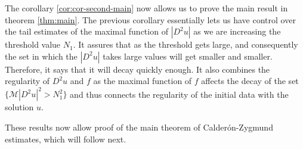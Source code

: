\documentclass[12pt]{artikel1}
\begin{document}
The corollary \ref{cor:cor-second-main} now allows us to prove the main result in theorem \ref{thm:main}. The previous corollary essentially lets us have control over the tail estimates of the maximal function of $|D^2u|$ as we are increasing the threshold value $N_1$. It assures that as the threshold gets large, and consequently the set in which the $|D^2u|$ takes large values will get smaller and smaller. Therefore, it says that it will decay quickly enough. It also combines the regularity of $D^2u$ and $f$ as the maximal function of $f$ affects the decay of the set $\{\mathcal{M}|D^2u|^2>N_1^2\}$ and thus connects the regularity of the initial data with the solution $u$.

These results now allow proof of the main theorem of Calder\'{o}n-Zygmund estimates, which will follow next.
\end{document}
